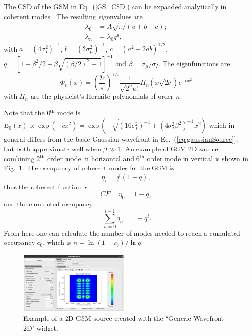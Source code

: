 \documentclass{iopconfser}
\begin{document}
The CSD of the GSM in Eq.~(\ref{GS_CSD}) can be expanded analytically in coherent modes \citep{Starikov82}. The resulting eigenvalues are
\begin{align}
\lambda_0 &= A \sqrt{\pi/( a+b+c)}; \\ 
\lambda_n &= \lambda_0 q ^n,
\end{align}
with $a = (4 \sigma_I^2)^{-1}$, $ 
b = (2 \sigma_{\mu}^2)^{-1}$, $ 
c = (a^2 + 2 a b)^{1/2}$,
$q = [1 + \beta^2/2 + \beta\sqrt{(\beta/2)^2+1}]^{-1}$ 
and $\beta=\sigma_{\mu}/\sigma_I$.
The eigenfunctions are
\begin{equation}
\Phi_n(x) = \left( \frac{2c}{\pi} \right)^{1/4} \frac{1}{\sqrt{2^n n!}} H_n(x\sqrt{2c})e^{-cx^2}
\label{GSeigenvalues}
\end{equation}
with $H_n$ are the physicist's Hermite polynomials of order $n$. 

Note that the 0$^\text{th}$ mode is $E_0(x) \propto \exp(-c x^2) = \exp(-\sqrt{(16 \sigma_I^2)^{-1} + (4 \sigma_I^2 \beta^2)^{-1}} x^2)$ which in general differs from the basic Gaussian wavefront in Eq.~(\ref{eq:gaussianSource}), but both approximate well when $\beta \gg 1$. An example of GSM 2D source combining 2$^\text{th}$ order mode in horizontal and 6$^\text{th}$ order mode in vertical is shown in Fig.~\ref{fig:GSM2D}.
The occupancy of coherent modes for the GSM is   
\begin{equation}\label{eq:GSMoccupancy}
\eta_i = q^i(1-q), 
\end{equation}
thus the coherent fraction is 
\begin{equation}\label{eq:GSMcoherentfraction}
    CF=\eta_0=1-q,
\end{equation}
and the cumulated occupancy
\begin{equation}\label{eq:GSMcumulatedoccupancy}
\ \sum_{n=0}^{i-1} \eta_n = 1-q^i.
\end{equation}
From here one can calculate the number of modes needed to reach a cumulated occupancy $c_0$, which is $n=\ln(1-c_0)/\ln q$.

\begin{figure}
    \centering
    \includegraphics[width=0.49\textwidth]{figures/GSM2D.png}
        
    \caption{Example of a 2D GSM source created with the ``Generic Wavefront 2D" widget.}
    \label{fig:GSM2D}
\end{figure}
\end{document}
